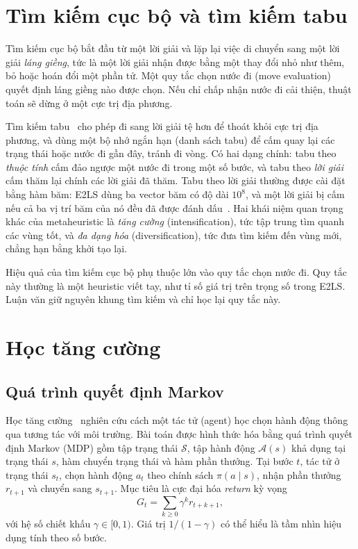 \section{Tìm kiếm cục bộ và tìm kiếm tabu}\label{sec:ls}

Tìm kiếm cục bộ bắt đầu từ một lời giải và lặp lại việc di chuyển sang một lời giải \emph{láng giềng}, tức là một lời giải nhận được bằng một thay đổi nhỏ như thêm, bỏ hoặc hoán đổi một phần tử. Một quy tắc chọn nước đi (move evaluation) quyết định láng giềng nào được chọn. Nếu chỉ chấp nhận nước đi cải thiện, thuật toán sẽ dừng ở một cực trị địa phương.

Tìm kiếm tabu~\cite{Glover1989} cho phép đi sang lời giải tệ hơn để thoát khỏi cực trị địa phương, và dùng một bộ nhớ ngắn hạn (danh sách tabu) để cấm quay lại các trạng thái hoặc nước đi gần đây, tránh đi vòng. Có hai dạng chính: tabu theo \emph{thuộc tính} cấm đảo ngược một nước đi trong một số bước, và tabu theo \emph{lời giải} cấm thăm lại chính các lời giải đã thăm. Tabu theo lời giải thường được cài đặt bằng hàm băm: E2LS dùng ba vector băm có độ dài $10^8$, và một lời giải bị cấm nếu cả ba vị trí băm của nó đều đã được đánh dấu~\cite{Zhu2022}. Hai khái niệm quan trọng khác của metaheuristic là \emph{tăng cường} (intensification), tức tập trung tìm quanh các vùng tốt, và \emph{đa dạng hóa} (diversification), tức đưa tìm kiếm đến vùng mới, chẳng hạn bằng khởi tạo lại.

Hiệu quả của tìm kiếm cục bộ phụ thuộc lớn vào quy tắc chọn nước đi. Quy tắc này thường là một heuristic viết tay, như tỉ số giá trị trên trọng số trong E2LS. Luận văn giữ nguyên khung tìm kiếm và chỉ học lại quy tắc này.

\section{Học tăng cường}\label{sec:rl}

\subsection{Quá trình quyết định Markov}

Học tăng cường~\cite{Sutton2018} nghiên cứu cách một tác tử (agent) học chọn hành động thông qua tương tác với môi trường. Bài toán được hình thức hóa bằng quá trình quyết định Markov (MDP) gồm tập trạng thái $\mathcal{S}$, tập hành động $\mathcal{A}(s)$ khả dụng tại trạng thái $s$, hàm chuyển trạng thái và hàm phần thưởng. Tại bước $t$, tác tử ở trạng thái $s_t$, chọn hành động $a_t$ theo chính sách $\pi(a\mid s)$, nhận phần thưởng $r_{t+1}$ và chuyển sang $s_{t+1}$. Mục tiêu là cực đại hóa \emph{return} kỳ vọng
\begin{equation}
G_t=\sum_{k\ge 0}\gamma^k r_{t+k+1},
\end{equation}
với hệ số chiết khấu $\gamma\in[0,1)$. Giá trị $1/(1-\gamma)$ có thể hiểu là tầm nhìn hiệu dụng tính theo số bước.

